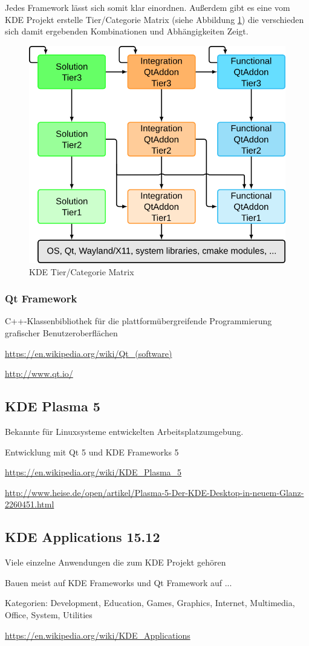 \documentclass[10pt,a4paper,twocolumn]{article}
\begin{document}
Jedes Framework lässt sich somit klar einordnen. Außerdem gibt es eine vom KDE Projekt erstelle Tier/Categorie Matrix (siehe Abbildung \ref{fig:kde_matrix}) die verschieden sich damit ergebenden Kombinationen und Abhängigkeiten Zeigt.

\begin{figure}[h]
	\centering
	\includegraphics[width=0.9\columnwidth]{images/kf5_no_tier4_big.png}
	\caption{KDE Tier/Categorie Matrix}
	\label{fig:kde_matrix}
\end{figure}

\subsubsection{Qt Framework}
C++-Klassenbibliothek für die plattformübergreifende Programmierung grafischer Benutzeroberflächen

\url{https://en.wikipedia.org/wiki/Qt_(software)}

\url{http://www.qt.io/}

\subsection{KDE Plasma 5}
Bekannte für Linuxsysteme entwickelten Arbeitsplatzumgebung.

Entwicklung mit Qt 5 und KDE Frameworks 5

\url{https://en.wikipedia.org/wiki/KDE_Plasma_5}

\url{http://www.heise.de/open/artikel/Plasma-5-Der-KDE-Desktop-in-neuem-Glanz-2260451.html}

\subsection{KDE Applications 15.12}
Viele einzelne Anwendungen die zum KDE Projekt gehören

Bauen meist auf KDE Frameworks und Qt Framework auf ...

Kategorien: Development, Education, Games, Graphics, Internet, Multimedia, Office, System, Utilities

\url{https://en.wikipedia.org/wiki/KDE_Applications}
\end{document}
